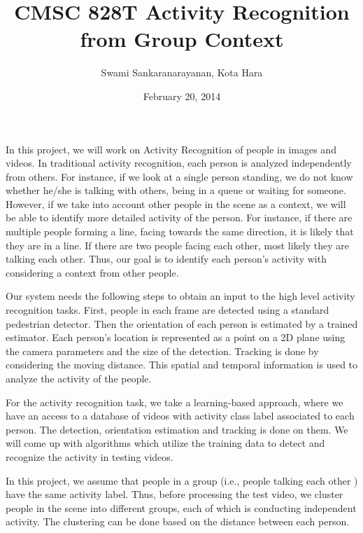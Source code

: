 \documentclass[12pt,twocolumn]{article}   %
\begin{document}
\title{CMSC 828T Activity Recognition from Group Context}   %
\author{Swami Sankaranarayanan, Kota Hara}         %
\date{February 20, 2014}    %
\maketitle

In this project, we will work on Activity Recognition of people in images and videos. In traditional activity recognition, each person is analyzed independently from others. For instance, if we look at a single person standing, we do not know whether he/she is talking with others, being in a queue or waiting for someone. However, if we take into account other people in the scene as a context, we will be able to identify more detailed activity of the person. For instance, if there are multiple people forming a line, facing towards the same direction, it is likely that they are in a line. If there are two people facing each other, most likely they are talking each other. Thus, our goal is to identify each person's activity with considering a context from other people.

Our system needs the following steps to obtain an input to the high level activity recognition tasks. First, people in each frame are detected using a standard pedestrian detector. Then the orientation of each person is estimated by a trained estimator. Each person's location is represented as a point on a 2D plane using the camera parameters and the size of the detection. Tracking is done by considering the moving distance. This spatial and temporal information is used to analyze the activity of the people.

For the activity recognition task, we take a learning-based approach, where we have an access to a database of videos with activity class label associated to each person. The detection, orientation estimation and tracking is done on them. We will come up with algorithms which utilize the training data to detect and recognize the activity in testing videos. 

In this project, we assume that people in a group (i.e., people talking each other ) have the same activity label. Thus, before processing the test video, we cluster people in the scene into different groups, each of which is conducting independent activity. The clustering can be done based on the distance between each person. 
\end{document}
